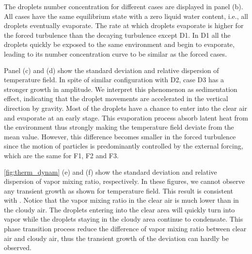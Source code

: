 \documentclass[draft,jgrga]{AGUTeX}
\begin{document}
\begin{article}
The droplets number concentration for different cases are displayed in panel (b). All cases have the same equilibrium state with a zero liquid water content, i.e., all droplets eventually evaporate. The rate at which droplets evaporate is higher for the forced turbulence than the decaying turbulence except D1. In D1 all the droplets quickly be exposed to the same environment and begin to evaporate, leading to its number concentration curve to be similar as the forced cases.

Panel (c) and (d) show the standard deviation and relative dispersion of temperature field. In spite of similar configuration with D2, case D3 has a stronger growth in amplitude. We interpret this phenomenon as sedimentation effect, indicating that the droplet movements are accelerated in the vertical direction by gravity. Most of the droplets have a chance to enter into the clear air and evaporate at an early stage. This evaporation process absorb latent heat from the environment thus strongly making the temperature field deviate from the mean value. However, this difference becomes smaller in the forced turbulence since the motion of particles is predominantly controlled by the external forcing, which are the same for F1, F2 and F3.

\ref{fig:therm_dynam} (e) and (f) show the standard deviation and relative dispersion of vapor mixing ratio, respectively. In these figures, we cannot observe any transient growth as shown for temperature field. This result is consistent with \cite{Kumar14}. Notice that the vapor mixing ratio in the clear air is much lower than in the cloudy air. The droplets entering into the clear area will quickly turn into vapor while the droplets staying in the cloudy area continue to condensate. This phase transition process reduce the difference of vapor mixing ratio between clear air and cloudy air, thus the transient growth of the deviation can hardly be observed.


\end{article}
\end{document}
